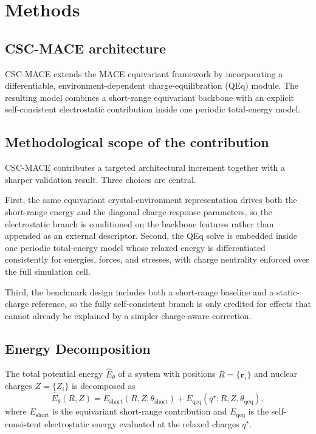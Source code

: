 \section{Methods}
\label{sec:methods}

\subsection{CSC-MACE architecture}

CSC-MACE extends the MACE equivariant framework by incorporating a differentiable, environment-dependent charge-equilibration (QEq) module. The resulting model combines a short-range equivariant backbone with an explicit self-consistent electrostatic contribution inside one periodic total-energy model.

\subsection{Methodological scope of the contribution}

CSC-MACE contributes a targeted architectural increment together with a sharper validation result. Three choices are central.

First, the same equivariant crystal-environment representation drives both the short-range energy and the diagonal charge-response parameters, so the electrostatic branch is conditioned on the backbone features rather than appended as an external descriptor. Second, the QEq solve is embedded inside one periodic total-energy model whose relaxed energy is differentiated consistently for energies, forces, and stresses, with charge neutrality enforced over the full simulation cell.

Third, the benchmark design includes both a short-range baseline and a static-charge reference, so the fully self-consistent branch is only credited for effects that cannot already be explained by a simpler charge-aware correction.

\subsection{Energy Decomposition}
The total potential energy $\hat{E}_\theta$ of a system with positions $R = \{\mathbf{r}_i\}$ and nuclear charges $Z = \{Z_i\}$ is decomposed as
\begin{equation}
    \hat{E}_\theta(R, Z) = E_{\text{short}}(R, Z; \theta_{\text{short}}) + E_{\text{qeq}}(q^\star; R, Z, \theta_{\text{qeq}}),
    \label{eq:total_energy}
\end{equation}
where $E_{\text{short}}$ is the equivariant short-range contribution and $E_{\text{qeq}}$ is the self-consistent electrostatic energy evaluated at the relaxed charges $q^\star$.

